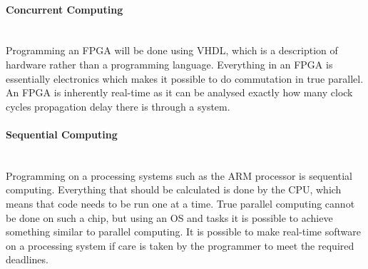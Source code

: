 \paragraph{Concurrent Computing}~\\ %
\label{par:concurrent_computing}
Programming an FPGA will be done using VHDL, which is a description of hardware rather than a programming language. 
Everything in an FPGA is essentially electronics which makes it possible to do commutation in true parallel. 
An FPGA is inherently real-time as it can be analysed exactly how many clock cycles propagation delay there is through a system.

\paragraph{Sequential Computing}~\\ %
\label{par:sequential_computing}
Programming on a processing systems such as the ARM processor is sequential computing. 
Everything that should be calculated is done by the CPU, which means that code needs to be run one at a time.
True parallel computing cannot be done on such a chip, but using an OS and tasks it is possible to achieve something similar to parallel computing.
It is possible to make real-time software on a processing system if care is taken by the programmer to meet the required deadlines. 

